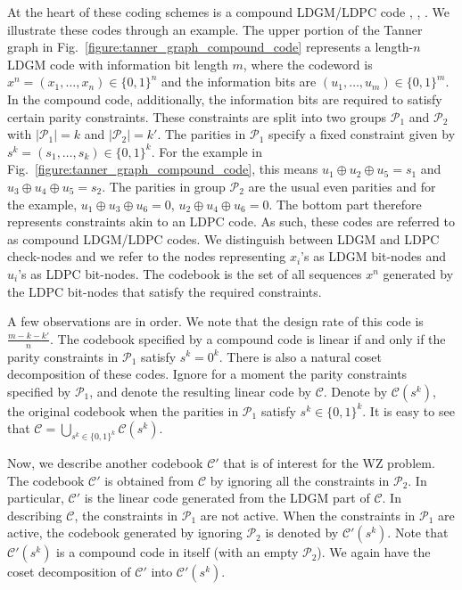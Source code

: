 At the heart of these coding schemes is a compound LDGM/LDPC code \cite{Hsu-it10}, \cite{MacKay-elet96}, \cite{Wainwright-it09}.
We illustrate these codes through an example.
The upper portion of the Tanner graph in Fig.~\ref{figure:tanner_graph_compound_code} represents a length-$n$ LDGM code with information bit length $m$, where the codeword is $x^n=(x_1,\ldots,x_n) \in \{0,1\}^n$ and the information bits are $(u_1,\ldots,u_m) \in \{0,1\}^m$.
In the compound code, additionally, the information bits are required to satisfy certain parity constraints.
These constraints are split into two groups $\mathcal{P}_1$ and $\mathcal{P}_2$ with $|\mathcal{P}_1|=k$ and $|\mathcal{P}_2|=k'$.
The parities in $\mathcal{P}_1$ specify a fixed constraint given by $s^k=(s_1,\ldots,s_k) \in \{0,1\}^k$.
For the example in Fig.~\ref{figure:tanner_graph_compound_code}, this means $u_1 \oplus u_2 \oplus u_5=s_1$ and $u_3 \oplus u_4 \oplus u_5=s_2$.
The parities in group $\mathcal{P}_2$ are the usual even parities and for the example, $u_1 \oplus u_3 \oplus u_6=0$, $u_2 \oplus u_4 \oplus u_6=0$.
The bottom part therefore represents constraints akin to an LDPC code.
As such, these codes are referred to as compound LDGM/LDPC codes.
We distinguish between LDGM and LDPC check-nodes and we refer to the nodes representing $x_i$'s as LDGM bit-nodes and $u_i$'s as LDPC bit-nodes.
The codebook is the set of all sequences $x^n$ generated by the LDPC bit-nodes that satisfy the required constraints.

A few observations are in order.
We note that the design rate of this code is $\tfrac{m-k-k'}{n}$.
The codebook specified by a compound code is linear if and only if the parity constraints in $\mathcal{P}_1$ satisfy $s^k=0^k$.
There is also a natural coset decomposition of these codes.
Ignore for a moment the parity constraints specified by $\mathcal{P}_1$, and denote the resulting linear code by $\mathcal{C}$.
Denote by $\mathcal{C}(s^k)$, the original codebook when the parities in $\mathcal{P}_1$ satisfy $s^k \in \{0,1\}^k$.
It is easy to see that $\mathcal{C} = \bigcup_{s^k \in \{0,1\}^k} \mathcal{C}(s^k)$.

Now, we describe another codebook $\mathcal{C}'$ that is of interest for the WZ problem.
The codebook $\mathcal{C}'$ is obtained from $\mathcal{C}$ by ignoring all the constraints in $\mathcal{P}_2$.
In particular, $\mathcal{C}'$ is the linear code generated from the LDGM part of $\mathcal{C}$.
In describing $\mathcal{C}$, the constraints in $\mathcal{P}_1$ are not active.
When the constraints in $\mathcal{P}_1$ are active, the codebook generated by ignoring $\mathcal{P}_2$ is denoted by $\mathcal{C}'(s^k)$.
Note that $\mathcal{C}'(s^k)$ is a compound code in itself (with an empty $\mathcal{P}_2$).
We again have the coset decomposition of $\mathcal{C}'$ into $\mathcal{C}'(s^k)$.

